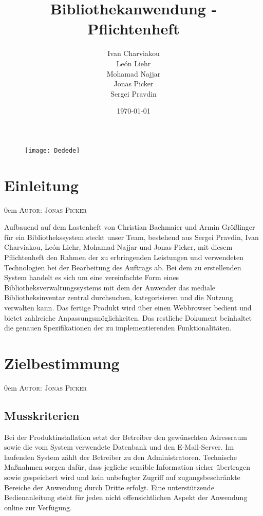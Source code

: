 \documentclass{article}
\title{Bibliothekanwendung - Pflichtenheft}
\date{\today}
\author{
	Ivan Charviakou\\
	León Liehr\\
	Mohamad Najjar\\
	Jonas Picker\\
	Sergei Pravdin
}
\makeatletter
\newcommand{\sectionauthor}[1]{
	{\parindent 0em \large \scshape Autor: #1 \par \nobreak \vspace*{2em}}
	\@afterheading
}
\makeatother
\begin{document}
\maketitle
\begin{figure}[h]
	\centering
	\texttt{[image: Dedede]}
\end{figure}
\newpage

\tableofcontents
\newpage

\section{Einleitung} %
\sectionauthor{Jonas Picker}
Aufbauend auf dem Lastenheft von Christian Bachmaier und Armin Größlinger für ein Bibliothekssystem steckt unser Team, bestehend aus Sergei Pravdin, Ivan Charviakou, León Liehr, Mohamad Najjar und Jonas Picker, mit diesem Pflichtenheft den Rahmen der zu erbringenden Leistungen und verwendeten Technologien bei der Bearbeitung des Auftrags ab. Bei dem zu erstellenden System handelt es sich um eine vereinfachte Form eines Bibliotheksverwaltungssystems mit dem der Anwender das mediale Bibliotheksinventar zentral durchsuchen, kategorisieren und die Nutzung verwalten kann. Das fertige Produkt wird über einen Webbrowser bedient und bietet zahlreiche Anpassungsmöglichkeiten. Das restliche Dokument beinhaltet die genauen Spezifikationen der zu implementierenden Funktionalitäten.

\section{Zielbestimmung} %
\sectionauthor{Jonas Picker}

\subsection{Musskriterien}
Bei der Produktinstallation setzt der Betreiber den gewünschten Adressraum sowie die vom System verwendete Datenbank und den E-Mail-Server. Im laufenden System zählt der Betreiber zu den Administratoren. Technische Maßnahmen sorgen dafür, dass jegliche sensible Information sicher übertragen sowie gespeichert wird und kein unbefugter Zugriff auf zugangsbeschränkte Bereiche der Anwendung durch Dritte erfolgt. Eine unterstützende Bedienanleitung steht für jeden nicht offensichtlichen Aspekt der Anwendung online zur Verfügung.
\end{document}
